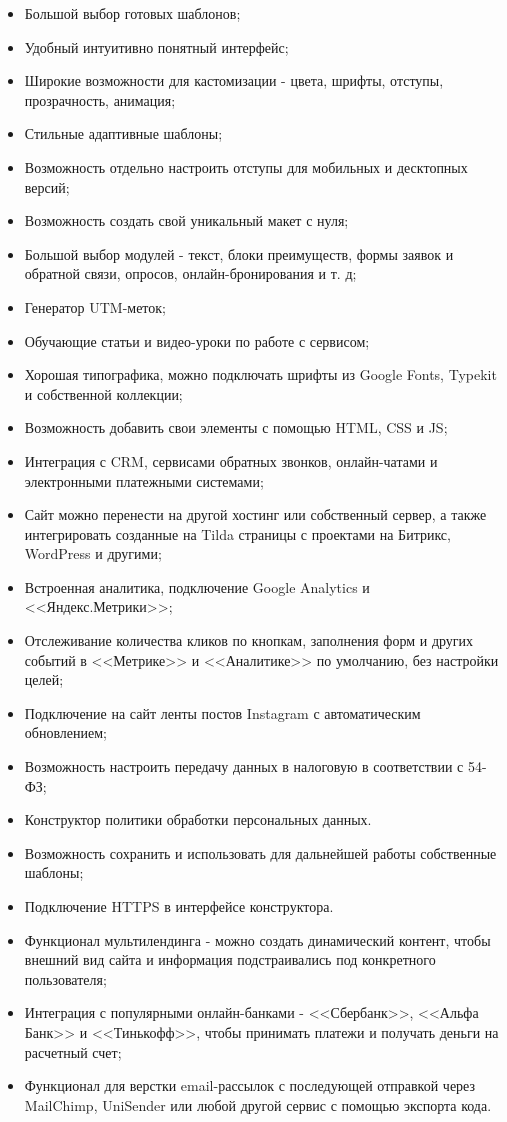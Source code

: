 \begin{itemize}
	\item	Большой выбор готовых шаблонов;
	\item	Удобный интуитивно понятный интерфейс;
	\item	Широкие возможности для кастомизации - цвета, шрифты, отступы, прозрачность, анимация;
	\item	Стильные адаптивные шаблоны;
	\item	Возможность отдельно настроить отступы для мобильных и десктопных версий;
	\item	Возможность создать свой уникальный макет с нуля;
	\item	Большой выбор модулей - текст, блоки преимуществ, формы заявок и обратной связи, опросов, онлайн-бронирования и т. д;
	\item	Генератор UTM-меток;
	\item	Обучающие статьи и видео-уроки по работе с сервисом;
	\item	Хорошая типографика, можно подключать шрифты из Google Fonts, Typekit и собственной коллекции;
	\item	Возможность добавить свои элементы с помощью HTML, CSS и JS;
	\item	Интеграция с CRM, сервисами обратных звонков, онлайн-чатами и электронными платежными системами;
	\item	Сайт можно перенести на другой хостинг или собственный сервер, а также интегрировать созданные на Tilda страницы с проектами на Битрикс, WordPress и другими;
	\item	Встроенная аналитика, подключение Google Analytics и <<Яндекс.Метрики>>;
	\item	Отслеживание количества кликов по кнопкам, заполнения форм и других событий в <<Метрике>> и <<Аналитике>> по умолчанию, без настройки целей;
	\item	Подключение на сайт ленты постов Instagram с автоматическим обновлением;
	\item	Возможность настроить передачу данных в налоговую в соответствии с 54-ФЗ;
	\item	Конструктор политики обработки персональных данных.
	\item	Возможность сохранить и использовать для дальнейшей работы собственные шаблоны;
	\item	Подключение HTTPS в интерфейсе конструктора.
	\item	Функционал мультилендинга - можно создать динамический контент, чтобы внешний вид сайта и информация подстраивались под конкретного пользователя;
	\item	Интеграция с популярными онлайн-банками - <<Сбербанк>>, <<Альфа Банк>> и <<Тинькофф>>, чтобы принимать платежи и получать деньги на расчетный счет;
	\item	Функционал для верстки email-рассылок с последующей отправкой через MailChimp, UniSender или любой другой сервис с помощью экспорта кода.
\end{itemize}

